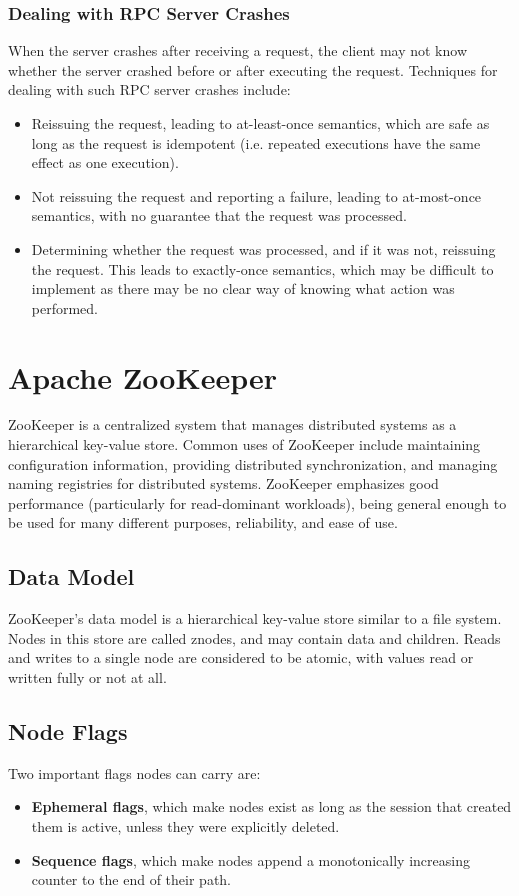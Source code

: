 \documentclass[12pt,titlepage]{article}
\let\stdsection\section
\renewcommand\section{\clearpage\stdsection}
\begin{document}
      \subsubsection{Dealing with RPC Server Crashes}
        When the server crashes after receiving a request, the client may not know whether the server crashed
        before or after executing the request. Techniques for dealing with such RPC server crashes include:
        \begin{itemize}
          \item Reissuing the request, leading to at-least-once semantics, which are safe as long as the request is idempotent
            (i.e. repeated executions have the same effect as one execution).
          \item Not reissuing the request and reporting a failure, leading to at-most-once semantics, with no guarantee that the
            request was processed.
          \item Determining whether the request was processed, and if it was not, reissuing the request. This leads to exactly-once
            semantics, which may be difficult to implement as there may be no clear way of knowing what action was performed.
        \end{itemize}

  \section{Apache ZooKeeper}
    ZooKeeper is a centralized system that manages distributed systems as a hierarchical key-value store. Common uses of ZooKeeper
    include maintaining configuration information, providing distributed synchronization, and managing naming registries for distributed
    systems. ZooKeeper emphasizes good performance (particularly for read-dominant workloads), being general enough to be used for many
    different purposes, reliability, and ease of use.

    \subsection{Data Model}
      ZooKeeper's data model is a hierarchical key-value store similar to a file system. Nodes in this store are called znodes, and may
      contain data and children. Reads and writes to a single node are considered to be atomic, with values read or written fully or not
      at all.

    \subsection{Node Flags}
      Two important flags nodes can carry are:
      \begin{itemize}
        \item \textbf{Ephemeral flags}, which make nodes exist as long as the session that created them is active, unless they were explicitly deleted.
        \item \textbf{Sequence flags}, which make nodes append a monotonically increasing counter to the end of their path.
      \end{itemize}
\end{document}
